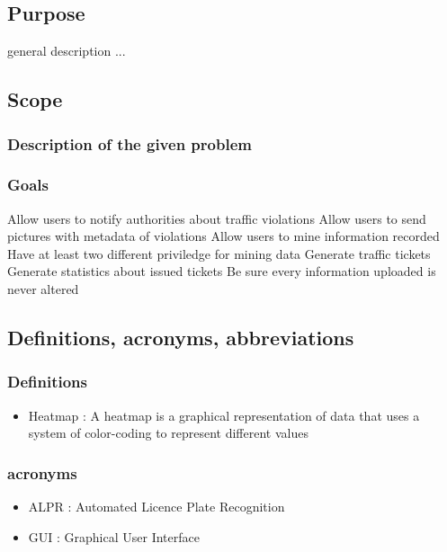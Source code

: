 




\subsection{Purpose}
general description ...

\subsection{Scope}

\subsubsection{Description of the given problem}


\subsubsection{Goals}
\begin{enumerate}
   Allow users to notify authorities about traffic violations
   Allow users to send pictures with metadata of violations
   Allow users to mine information recorded
   Have at least two different  priviledge for mining data
   Generate traffic tickets
   Generate statistics about issued tickets
   Be sure every information uploaded is never altered
\end{enumerate}



\subsection{Definitions,  acronyms,  abbreviations}

\subsubsection{Definitions}
\begin{itemize}
  \item Heatmap : A heatmap is a graphical representation of data that uses a system of color-coding to represent different values

\end{itemize}




\subsubsection{acronyms}
\begin{itemize}
  \item ALPR : Automated Licence Plate Recognition
  \item GUI : Graphical User Interface
\end{itemize}


